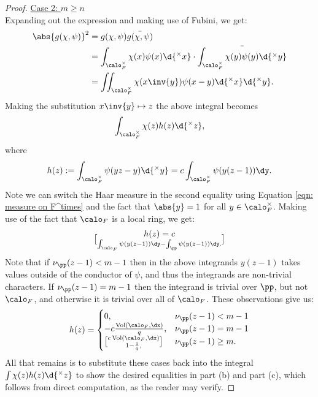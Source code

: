 \documentclass[11pt, x11names, openany]{book}
\begin{document}
\begin{proof}
\underline{Case 2: $m \geq n$}\\
Expanding out the expression and making use of Fubini, we get:
\begin{align*}
    \abs{g(\chi, \psi)}^2 &= g(\chi, \psi) \bar{g(\chi, \psi)}\\
    &= \int_{\calo_F^\times} \chi(x) \psi(x) \d{^\times x} \cdot \bar{\int_{\calo_F^\times} \chi(y) \psi(y) \d{^\times  y}}\\
    &= \iint_{\calo_F^\times} \chi(x\inv{y})\psi(x-y)  \d{^\times x} \d{^\times  y}.
\end{align*}
Making the substitution $x\inv{y} \mapsto z$ the above integral becomes
\begin{equation*}
    \int_{\calo_F^\times} \chi(z) h(z) \d{^\times  z},
\end{equation*}
where 
\begin{equation*}
    h(z) := \int_{\calo_F^\times} \psi(yz - y)\d{^\times  y} = c \int_{\calo_F^\times} \psi(y(z-1)) \dy.
\end{equation*}
Note we can switch the Haar measure in the second equality using Equation \ref{eqn: measure on F^times} and the fact that $\abs{y} = 1$ for all $y \in \calo_F^\times$. Making use of the fact that $\calo_F$ is a local ring, we get:
\begin{equation*}
    h(z) = c \brack{\int_{\calo_F} \psi(y(z - 1)) \dy - \int_\pp \psi(y(z - 1)) \dy}.
\end{equation*}
Note that if $\nu_\pp(z-1)  <  m-1$ then in the above integrands $y(z-1)$ takes values outside of the conductor of $\psi$, and thus the integrands are non-trivial characters. If $\nu_\pp(z-1) = m - 1$ then the integrand is trivial over $\pp$, but not $\calo_F$, and otherwise it is trivial over all of $\calo_F$. These observations give us:
\begin{equation*}
    h(z) = \begin{cases}
        0, & \nu_\pp(z-1) < m-1\\
        -c\frac{\vol(\calo_F, \dx)}{q}, & \nu_\pp(z-1) = m-1\\
        c\vol(\calo_F, \dx)\brack{1 - \frac{1}{q}}, &   \nu_\pp(z-1) \geq m.
    \end{cases}
\end{equation*}
All that remains is to substitute these cases back into the integral $\int \chi(z)h(z) \d{^\times  z}$ to show the desired equalities in part (b) and part (c), which follows from direct computation, as the reader may verify.
\end{proof}
\end{document}

